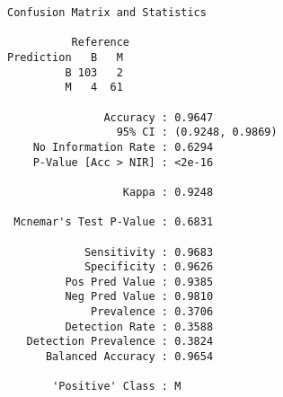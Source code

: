 \documentclass[]{article}
\newenvironment{Shaded}{\begin{snugshade}}{\end{snugshade}}
\newcommand{\CommentTok}[1]{\textcolor[rgb]{0.56,0.35,0.01}{\textit{#1}}}
\newcommand{\DataTypeTok}[1]{\textcolor[rgb]{0.13,0.29,0.53}{#1}}
\newcommand{\DecValTok}[1]{\textcolor[rgb]{0.00,0.00,0.81}{#1}}
\newcommand{\KeywordTok}[1]{\textcolor[rgb]{0.13,0.29,0.53}{\textbf{#1}}}
\newcommand{\NormalTok}[1]{#1}
\newcommand{\OperatorTok}[1]{\textcolor[rgb]{0.81,0.36,0.00}{\textbf{#1}}}
\newcommand{\StringTok}[1]{\textcolor[rgb]{0.31,0.60,0.02}{#1}}
\begin{document}
\begin{Shaded}
\end{Shaded}

\begin{verbatim}
Confusion Matrix and Statistics

          Reference
Prediction   B   M
         B 103   2
         M   4  61
                                          
               Accuracy : 0.9647          
                 95% CI : (0.9248, 0.9869)
    No Information Rate : 0.6294          
    P-Value [Acc > NIR] : <2e-16          
                                          
                  Kappa : 0.9248          
                                          
 Mcnemar's Test P-Value : 0.6831          
                                          
            Sensitivity : 0.9683          
            Specificity : 0.9626          
         Pos Pred Value : 0.9385          
         Neg Pred Value : 0.9810          
             Prevalence : 0.3706          
         Detection Rate : 0.3588          
   Detection Prevalence : 0.3824          
      Balanced Accuracy : 0.9654          
                                          
       'Positive' Class : M               
                                          
\end{verbatim}
\end{document}
